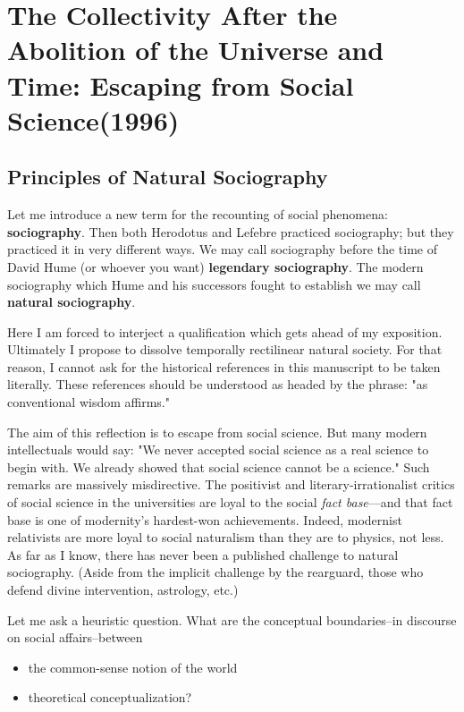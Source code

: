 
\chapter{The Collectivity After the Abolition of the Universe and Time: Escaping from Social Science(1996)}

\section{Principles of Natural Sociography}

Let me introduce a new term for the recounting of social phenomena: \textbf{sociography}. Then both Herodotus and Lefebre practiced sociography; but they practiced it in very different ways. We may call sociography before the time of David Hume (or whoever you want) \textbf{legendary sociography}. The modern sociography which Hume and his successors fought to establish we may call \textbf{natural sociography}.

Here I am forced to interject a qualification which gets ahead of my exposition. Ultimately I propose to dissolve temporally rectilinear natural society. For that reason, I cannot ask for the historical references in this manuscript to be taken literally. These references should be understood as headed by the phrase: "as conventional wisdom affirms."

The aim of this reflection is to escape from social science. But many modern intellectuals would say: "We never accepted social science as a real science to begin with. We already showed that social science cannot be a science." Such remarks are massively misdirective. The positivist and literary-irrationalist critics of social science in the universities are loyal to the social \emph{fact base}---and that fact base is one of modernity’s hardest-won achievements. Indeed, modernist relativists are more loyal to social naturalism than they are to physics, not less. As far as I know, there has never been a published challenge to natural sociography. (Aside from the implicit challenge by the rearguard, those who defend divine intervention, astrology, etc.)

Let me ask a heuristic question. What are the conceptual boundaries–in discourse on social affairs–between
\begin{itemize}
\item the common-sense notion of the world
\item theoretical conceptualization?
\end{itemize}

